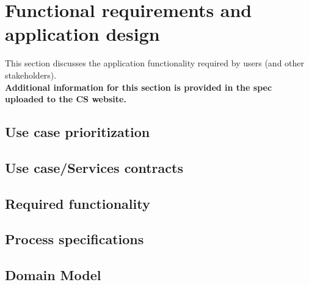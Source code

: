 \documentclass[a4paper,12pt]{article}
\begin{document}
\section{Functional requirements and application design}
This section discusses the application functionality required by users (and other stakeholders).\\
\textbf{Additional information for this section is provided in the spec uploaded to the CS website.}

\subsection{Use case prioritization}

\subsection{Use case/Services contracts}

\subsection{Required functionality}

\subsection{Process specifications}

\subsection{Domain Model}
\end{document}
